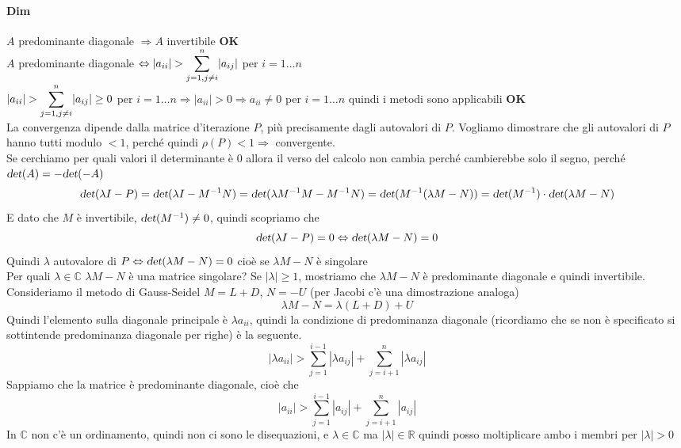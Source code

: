 \documentclass[10pt]{book}
\begin{document}
\paragraph{Dim} $A$ predominante diagonale $\Rightarrow A$ invertibile \textbf{OK}\\
$A$ predominante diagonale $\Leftrightarrow |a_{ii}| > \mathlarger{\sum_{j=1, j\neq i}^n} |a_{ij}|$ per $i=1\ldots n$\\
$|a_{ii}| > \mathlarger{\sum_{j=1, j\neq i}^n} |a_{ij}| \geq 0$ per $i=1\ldots n \Rightarrow |a_{ii}| > 0 \Rightarrow a_{ii} \neq 0$ per $i=1\ldots n$ quindi i metodi sono applicabili \textbf{OK}\\
La convergenza dipende dalla matrice d'iterazione $P$, più precisamente dagli autovalori di $P$. Vogliamo dimostrare che gli autovalori di $P$ hanno tutti modulo $< 1$, perché quindi $\rho(P) < 1 \Rightarrow$ convergente.\\
Se cerchiamo per quali valori il determinante è 0 allora il verso del calcolo non cambia perché cambierebbe solo il segno, perché $\textsl{det}(A) = -\textsl{det}(-A)$
$$\textsl{det}(\lambda I - P) = \textsl{det}(\lambda I - M^{-1}N) = \textsl{det}(\lambda M^{-1}M - M^{-1}N) = \textsl{det}( M^{-1}(\lambda M - N)) = \textsl{det}(M^{-1})\cdot\textsl{det}(\lambda M - N)$$
E dato che $M$ è invertibile, $\textsl{det}(M^{-1})\neq 0$, quindi scopriamo che
$$\textsl{det}(\lambda I - P) = 0 \Leftrightarrow \textsl{det}(\lambda M - N) = 0$$
Quindi $\lambda$ autovalore di $P \Leftrightarrow \textsl{det}(\lambda M - N) = 0$ cioè se $\lambda M - N$ è singolare\\
Per quali $\lambda \in \mathbb{C}$ $\lambda M - N$ è una matrice singolare? Se $|\lambda|\geq 1$, mostriamo che $\lambda M - N$ è predominante diagonale e quindi invertibile.\\
Consideriamo il metodo di Gauss-Seidel $M = L + D$, $N = - U$ (per Jacobi c'è una dimostrazione analoga)
$$\lambda M - N = \lambda(L+D)+U$$
Quindi l'elemento sulla diagonale principale è $\lambda a_{ii}$, quindi la condizione di predominanza diagonale (ricordiamo che se non è specificato si sottintende predominanza diagonale per righe) è la seguente.
$$|\lambda a_{ii}| > \sum_{j=1}^{i-1} |\lambda a_{ij}| + \sum_{j=i+1}^{n} |\lambda a_{ij}|$$
Sappiamo che la matrice è predominante diagonale, cioè che
$$|a_{ii}| > \sum_{j=1}^{i-1} |a_{ij}| + \sum_{j=i+1}^{n} |a_{ij}|$$
In $\mathbb{C}$ non c'è un ordinamento, quindi non ci sono le disequazioni, e $\lambda \in \mathbb{C}$ ma $|\lambda| \in \mathbb{R}$ quindi posso moltiplicare ambo i membri per $|\lambda| > 0$
\end{document}
